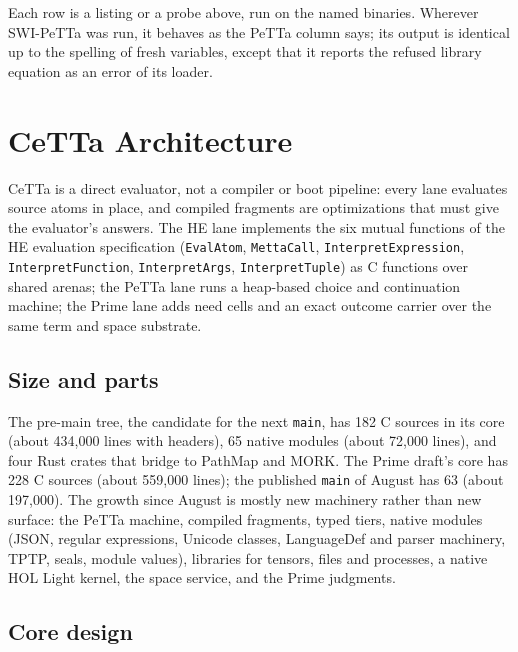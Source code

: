 \documentclass[11pt]{article}
\newcommand{\code}[1]{\texttt{#1}}
\newcommand{\PeTTa}{\textup{PeTTa}}
\newcommand{\HE}{\textup{HE}}
\newcommand{\CeTTa}{\textup{CeTTa}}
\newcommand{\PathMap}{\textup{PathMap}}
\begin{document}
\noindent
Each row is a listing or a probe above, run on the named binaries.  Wherever
SWI-\PeTTa{} was run, it behaves as the \PeTTa{} column says; its output is
identical up to the spelling of fresh variables, except that it reports the
refused library equation as an error of its loader.

\section{\CeTTa{} Architecture}
\label{sec:architecture}

\CeTTa{} is a direct evaluator, not a compiler or boot pipeline: every lane
evaluates source atoms in place, and compiled fragments are optimizations that
must give the evaluator's answers.  The \HE{} lane implements the six mutual
functions of the \HE{} evaluation specification (\code{EvalAtom},
\code{MettaCall}, \code{InterpretExpression}, \code{InterpretFunction},
\code{InterpretArgs}, \code{InterpretTuple}) as C functions over shared
arenas; the \PeTTa{} lane runs a heap-based choice and continuation machine;
the Prime lane adds need cells and an exact outcome carrier over the same term
and space substrate.

\subsection{Size and parts}

The pre-main tree, the candidate for the next \code{main}, has 182 C sources
in its core (about 434{,}000 lines with headers), 65 native modules (about
72{,}000 lines), and four Rust crates that bridge to \PathMap{} and MORK.  The
Prime draft's core has 228 C sources (about 559{,}000 lines); the published
\code{main} of August has 63 (about 197{,}000).  The growth since August is
mostly new machinery rather than new surface: the \PeTTa{} machine, compiled
fragments, typed tiers, native modules (JSON, regular expressions, Unicode
classes, LanguageDef and parser machinery, TPTP, seals, module values),
libraries for tensors, files and processes, a native HOL Light kernel, the
space service, and the Prime judgments.

\subsection{Core design}
\end{document}
